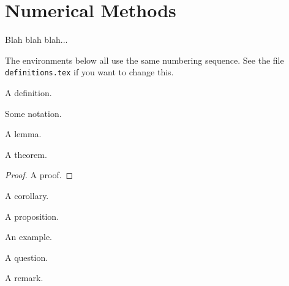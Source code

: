 
\chapter{Numerical Methods}
\label{chp:NumMethod}



Blah blah blah...

The environments below all use the same numbering sequence.  See
the file \verb+definitions.tex+ if you want to change this.

\begin{defn}
A definition.
\end{defn}

\begin{notn}
Some notation.
\end{notn}

\begin{lemma}
A lemma.
\end{lemma}

\begin{theorem}
A theorem.
\end{theorem}

\begin{proof}
A proof.
\end{proof}

\begin{cor}
A corollary.
\end{cor}

\begin{prop}
A proposition.
\end{prop}

\begin{ex}
An example.
\end{ex}

\begin{question}
A question.
\end{question}

\begin{remark}
A remark.
\end{remark}

